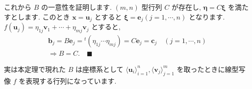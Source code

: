 \documentclass[openany, a4paper, oneside]{jsbook}
\begin{document}
これから $B$ の一意性を証明します.
 $(m,n)$ 型行列 $C$ が存在し,  $\bm{\eta} = C \bm{\xi}$ を満たすとします.
このとき $\bm{x} = \bm{u}_j$ とすると $\bm{\xi} = \bm{e}_j ( j = 1,\dotsb, n)$ となります.
 $f (\bm{u}_j) = \eta_{1j} \bm{v}_1 +  \dotsb + \eta_{m j} \bm{v}_j$ とすると,
\begin{gather}
    \bm{b}_j
    =
    B \bm{e}_j
    =
    {^t} ( \eta_{1j} \dotsb \eta_{m j} )
    =
    C \bm{e}_j
    =
    \bm{c}_j
    \quad
    (j = 1, \dotsb ,n)\\
    \Rightarrow
    B=C . \quad \blacksquare
\end{gather}

\begin{rem}
実は本定理で現れた $B$ は座標系として $\langle \bm{u}_i \rangle _{i=1}^n,\langle \bm{v}_j \rangle _{j=1}^m$
を取ったときに線型写像 $f$ を表現する行列になっています.
\end{rem}
\end{document}
